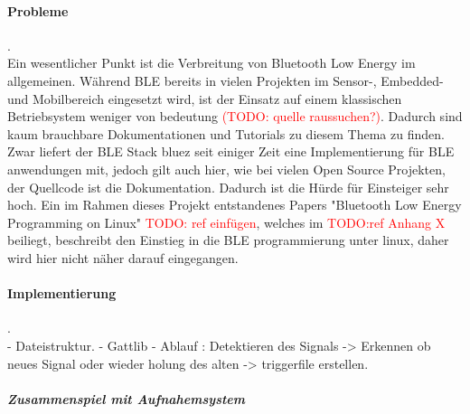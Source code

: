 \paragraph{Probleme}. \\ 
Ein wesentlicher Punkt ist die Verbreitung von Bluetooth Low Energy im allgemeinen. Während BLE bereits in vielen Projekten im Sensor-, Embedded- und Mobilbereich eingesetzt wird, ist der Einsatz auf einem klassischen Betriebsystem weniger von bedeutung \textcolor{red}{(TODO: quelle raussuchen?)}. Dadurch sind kaum brauchbare Dokumentationen und Tutorials zu diesem Thema zu finden. Zwar liefert der BLE Stack bluez seit einiger Zeit eine Implementierung für BLE anwendungen mit, jedoch gilt auch hier, wie bei vielen Open Source Projekten, der Quellcode ist die Dokumentation. Dadurch ist die Hürde für Einsteiger sehr hoch. Ein im Rahmen dieses Projekt entstandenes Papers "Bluetooth Low Energy Programming on Linux"  \textcolor{red}{TODO: ref einfügen}, welches im  \textcolor{red}{TODO:ref  Anhang X} beiliegt, beschreibt den Einstieg in die BLE programmierung unter linux, daher wird hier nicht näher darauf eingegangen. 

\paragraph{Implementierung}. \\

- Dateistruktur.
- Gattlib
- Ablauf : Detektieren des Signals -> Erkennen ob neues Signal oder wieder holung des alten
  -> triggerfile erstellen.
  


\subparagraph{Zusammenspiel mit Aufnahemsystem}
